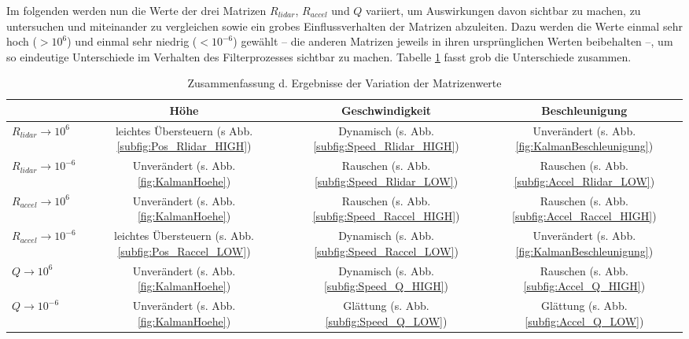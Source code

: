 \documentclass[12pt,a4paper]{article}
\begin{document}
\begin{enumerate}[label=\textbf{\arabic*})]
\begin{enumerate}[label=\textbf{\alph*})]
		Im folgenden werden nun die Werte der drei Matrizen $R_{lidar}$, $R_{accel}$ und $Q$ variiert, um Auswirkungen davon sichtbar zu machen, zu untersuchen und miteinander zu vergleichen sowie ein grobes Einflussverhalten der Matrizen abzuleiten. Dazu werden die Werte einmal sehr hoch ($>10^{6}$) und einmal sehr niedrig ($<10^{-6}$) gewählt -- die anderen Matrizen jeweils in ihren ursprünglichen Werten beibehalten --, um so eindeutige Unterschiede im Verhalten des Filterprozesses sichtbar zu machen. Tabelle \ref{tab:ErgebnisseVergleich} fasst grob die Unterschiede zusammen.
		\begin{table}[!ht]
	\scriptsize
	\centering
	\def\arraystretch{2}
	\setlength{\tabcolsep}{1em}
	\begin{tabular}{|l|c|c|c|}
		\hline
		\rule[-1ex]{0pt}{2.5ex}  & \textbf{Höhe} & \textbf{Geschwindigkeit} & \textbf{Beschleunigung} \\
		\hline
		\rule[-1ex]{0pt}{2.5ex} $R_{lidar}\rightarrow10^{6}$ & leichtes Übersteuern (s Abb. \ref{subfig:Pos_Rlidar_HIGH}) & Dynamisch (s. Abb. \ref{subfig:Speed_Rlidar_HIGH}) & Unverändert (s. Abb. \ref{fig:KalmanBeschleunigung}) \\
		\hline
		\rule[-1ex]{0pt}{2.5ex} $R_{lidar}\rightarrow10^{-6}$ & Unverändert (s. Abb. \ref{fig:KalmanHoehe}) & Rauschen (s. Abb. \ref{subfig:Speed_Rlidar_LOW}) & Rauschen (s. Abb. \ref{subfig:Accel_Rlidar_LOW}) \\
		\hline
		\rule[-1ex]{0pt}{2.5ex} $R_{accel}\rightarrow10^{6}$ & Unverändert (s. Abb. \ref{fig:KalmanHoehe}) & Rauschen (s. Abb. \ref{subfig:Speed_Raccel_HIGH}) & Rauschen (s. Abb. \ref{subfig:Accel_Raccel_HIGH}) \\
		\hline
		\rule[-1ex]{0pt}{2.5ex} $R_{accel}\rightarrow10^{-6}$ & leichtes Übersteuern (s. Abb. \ref{subfig:Pos_Raccel_LOW}) & Dynamisch (s. Abb. \ref{subfig:Speed_Raccel_LOW}) & Unverändert (s. Abb. \ref{fig:KalmanBeschleunigung}) \\
		\hline
		\rule[-1ex]{0pt}{2.5ex} $Q\rightarrow10^{6}$ & Unverändert (s. Abb. \ref{fig:KalmanHoehe}) & Dynamisch (s. Abb. \ref{subfig:Speed_Q_HIGH}) & Rauschen (s. Abb. \ref{subfig:Accel_Q_HIGH}) \\
		\hline
		\rule[-1ex]{0pt}{2.5ex} $Q\rightarrow10^{-6}$ & Unverändert (s. Abb. \ref{fig:KalmanHoehe}) & Glättung (s. Abb. \ref{subfig:Speed_Q_LOW}) & Glättung (s. Abb. \ref{subfig:Accel_Q_LOW}) \\
		\hline
		\end{tabular}
		\normalsize
		\caption{\label{tab:ErgebnisseVergleich}Zusammenfassung d. Ergebnisse der Variation der Matrizenwerte}

\end{table}
\end{enumerate}
\end{enumerate}
\end{document}
